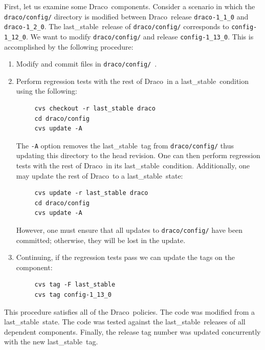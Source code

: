 \documentclass[11pt]{nmemo}
\newcommand{\draco}{{\normalfont\normalsize\sffamily Draco}}
\newcommand{\stable}{{\normalfont\normalsize\ttfamily last\_stable}}
\begin{document}
First, let us examine some \draco\ components.  Consider a scenario in
which the \texttt{draco/config/} directory is modified between \draco\ 
release \texttt{draco-1\_1\_0} and \texttt{draco-1\_2\_0}.  The
\stable\ release of \texttt{draco/config/} corresponds to
\texttt{config-1\_12\_0}.  We want to modify \texttt{draco/config/}
and release \texttt{config-1\_13\_0}.  This is accomplished by the
following procedure:
\begin{enumerate}
\item Modify and commit files in \texttt{draco/config/}\ .
\item Perform regression tests with the rest of \draco\ in a \stable\ 
  condition using the following:
\begin{verbatim}
     cvs checkout -r last_stable draco
     cd draco/config
     cvs update -A
\end{verbatim}
  The \texttt{-A} option removes the \stable\ tag from
  \texttt{draco/config/} thus updating this directory to the head
  revision.  One can then perform regression tests with the rest of
  \draco\ in its \stable\ condition.  Additionally, one may update the 
  rest of \draco\ to a \stable\ state:
\begin{verbatim}
     cvs update -r last_stable draco
     cd draco/config
     cvs update -A
\end{verbatim}
  However, one must ensure that all updates to \texttt{draco/config/}
  have been committed; otherwise, they will be lost in the update.
\item Continuing, if the regression tests pass we can update the tags
  on the component:
\begin{verbatim}
     cvs tag -F last_stable
     cvs tag config-1_13_0
\end{verbatim}
\end{enumerate}
This procedure satisfies all of the \draco\ policies.  The code was
modified from a \stable\ state.  The code was tested against the
\stable\ releases of all dependent components.  Finally, the release
tag number was updated concurrently with the new \stable\ tag.
\end{document}
